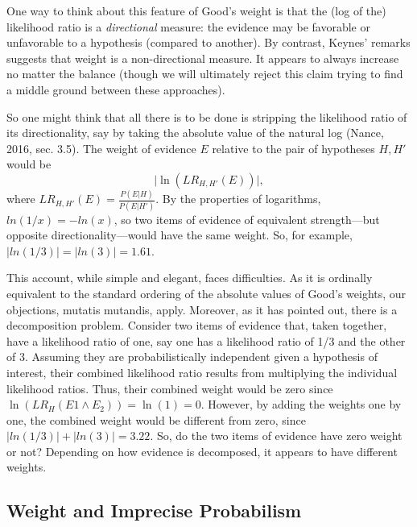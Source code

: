 \documentclass[
  10pt,
  dvipsnames,enabledeprecatedfontcommands]{scrartcl}
\begin{document}
One way to think about this feature of Good's weight is that the (log of
the) likelihood ratio is a \emph{directional} measure: the evidence may
be favorable or unfavorable to a hypothesis (compared to another). By
contrast, Keynes' remarks suggests that weight is a non-directional
measure. It appears to always increase no matter the balance (though we
will ultimately reject this claim trying to find a middle ground between
these approaches).

So one might think that all there is to be done is stripping the
likelihood ratio of its directionality, say by taking the absolute value
of the natural log (Nance, 2016, sec. 3.5). The weight of evidence \(E\)
relative to the pair of hypotheses \(H, H'\) would be
\[\vert \ln (LR_{H, H'}(E)) \vert, \] where
\(LR_{H, H'}(E)=\frac{P(E \vert H)}{P(E \vert H')}\). By the properties
of logarithms, \(ln(1/x) = -ln(x)\), so two items of evidence of
equivalent strength---but opposite directionality---would have the same
weight. So, for example, \(|ln(1/3)|= |ln(3)| = 1.61\).

This account, while simple and elegant, faces difficulties. As it is
ordinally equivalent to the standard ordering of the absolute values of
Good's weights, our objections, mutatis mutandis, apply. Moreover, as it
has pointed out, there is a decomposition problem.
Consider two items of evidence that, taken together, have a likelihood
ratio of one, say one has a likelihood ratio of 1/3 and the other of 3.
Assuming they are probabilistically independent given a hypothesis of
interest, their combined likelihood ratio results from multiplying the
individual likelihood ratios. Thus, their combined weight would be zero
since \(\ln (LR_H(E1 \wedge E_2))=\ln (1) = 0\). However, by adding the
weights one by one, the combined weight would be different from zero,
since \(|ln(1/3)| + |ln(3)| = 3.22\). So, do the two items of evidence
have zero weight or not? Depending on how evidence is decomposed, it
appears to have different weights.


\hypertarget{weight-and-imprecise-probabilism}{%
\subsection{Weight and Imprecise
Probabilism}\label{weight-and-imprecise-probabilism}}
\end{document}
